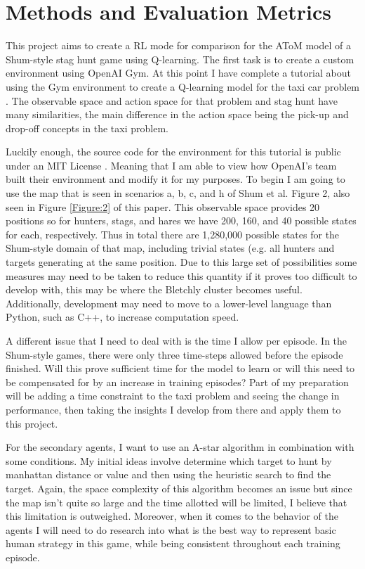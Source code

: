 \documentclass[10pt,twocolumn]{article}
\begin{document}
\section{Methods and Evaluation Metrics}

This project aims to create a RL mode for comparison for the AToM model of a Shum-style stag hunt game using Q-learning.
The first task is to create a custom environment using OpenAI Gym.
At this point I have complete a tutorial about using the Gym environment to create a Q-learning model for the taxi car problem \cite{Taxi-v3, Kansal2018}.
The observable space and action space for that problem and stag hunt have many similarities, the main difference in the action space being the pick-up and drop-off concepts in the taxi problem.

Luckily enough, the source code for the environment for this tutorial is public under an MIT License \cite{Taxi-v3Source}.
Meaning that I am able to view how OpenAI's team built their environment and modify it for my purposes.
To begin I am going to use the map that is seen in scenarios a, b, c, and h of Shum et al. Figure 2, also seen in Figure \ref{Figure:2} of this paper.
This observable space provides 20 positions so for hunters, stags, and hares we have 200, 160, and 40 possible states for each, respectively.
Thus in total there are 1,280,000 possible states for the Shum-style domain of that map, including trivial states (e.g. all hunters and targets generating at the same position.
Due to this large set of possibilities some measures may need to be taken to reduce this quantity if it proves too difficult to develop with, this may be where the Bletchly cluster becomes useful.
Additionally, development may need to move to a lower-level language than Python, such as C++, to increase computation speed.

A different issue that I need to deal with is the time I allow per episode.
In the Shum-style games, there were only three time-steps allowed before the episode finished.
Will this prove sufficient time for the model to learn or will this need to be compensated for by an increase in training episodes?
Part of my preparation will be adding a time constraint to the taxi problem and seeing the change in performance, then taking the insights I develop from there and apply them to this project.

For the secondary agents, I want to use an A-star algorithm in combination with some conditions.
My initial ideas involve determine which target to hunt by manhattan distance or value and then using the heuristic search to find the target.
Again, the space complexity of this algorithm becomes an issue but since the map isn't quite so large and the time allotted will be limited, I believe that this limitation is outweighed.
Moreover, when it comes to the behavior of the agents I will need to do research into what is the best way to represent basic human strategy in this game, while being consistent throughout each training episode.
\end{document}
